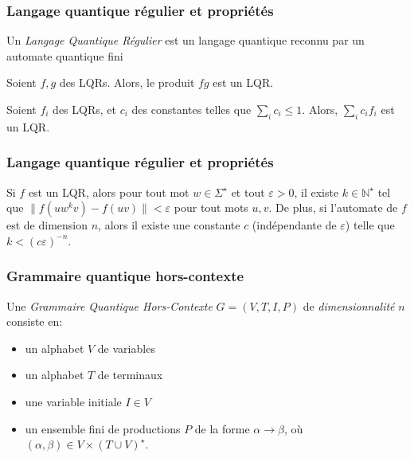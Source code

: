 \documentclass[aspectratio=169]{beamer}
\theoremstyle{plain}
\theoremstyle{definition}
\begin{document}
\begin{frame}
    \frametitle{Langage quantique régulier et propriétés}
    \begin{definition}[LQR]
        Un \emph{Langage Quantique Régulier} est un langage quantique reconnu par un automate quantique fini
    \end{definition}

    \begin{theorem}
        Soient $f, g$ des LQRs. Alors, le produit $fg$ est un LQR.
    \end{theorem}

    \begin{theorem}
        Soient $f_i$ des LQRs, et $c_i$ des constantes telles que $\sum_i c_i \leq 1$. Alors, $\sum_i c_if_i$ est un LQR.
    \end{theorem}
\end{frame}

\begin{frame}
    \frametitle{Langage quantique régulier et propriétés}
    \begin{theorem}
        Si $f$ est un LQR, alors pour tout mot $w\in\Sigma^\star$ et tout $\varepsilon > 0$, il existe $k\in \mathbb{N}^\star$ tel que $\|f(uw^kv) - f(uv)\| < \varepsilon$ pour tout mots $u, v$. De plus, si l'automate de $f$ est de dimension $n$, alors il existe une constante $c$ (indépendante de $\varepsilon$) telle que $k < (c\varepsilon)^{-n}$.
    \end{theorem}
\end{frame}

\begin{frame}
    \frametitle{Grammaire quantique hors-contexte}
    \begin{definition}
        Une \emph{Grammaire Quantique Hors-Contexte} $G=(V, T, I, P)$ de \emph{dimensionnalité} $n$ consiste en:
        \begin{itemize}[label=--, noitemsep]
            \item un alphabet $V$ de variables
            \item un alphabet $T$ de terminaux
            \item une variable initiale $I\in V$
            \item un ensemble fini de productions $P$ de la forme $\alpha\to \beta$, où $(\alpha, \beta)\in V\times (T\cup V)^\star$.
        \end{itemize}
        
    \end{definition}
\end{frame}
\end{document}

